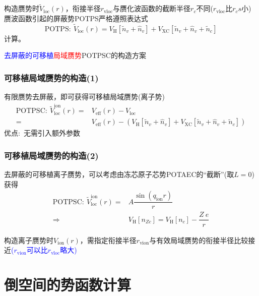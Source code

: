 构造赝势时$\tilde{V}_{\mathrm{loc}}(r)$，衔接半径$r_{\mathrm{vloc}}$与赝化波函数的截断半径$r_c$不同($r_{\mathrm{vloc}}$比$r_cs$小)
赝波函数引起的屏蔽势\textrm{POTPS}严格遵照表达式
\begin{equation}
	\mathrm{POTPS}:~\tilde{V}_{\mathrm{loc}}(r) = V_{\mathrm{H}}[\tilde{n}_v+\hat{n}_v]+V_{\mathrm{XC}}[\tilde{n}_v+\hat{n}_v+\tilde{n}_c]
	\label{eq:POTPS}
\end{equation}
计算。

\textcolor{blue}{去屏蔽的}\textcolor{blue}{可移植}\textcolor{red}{局域赝势}\textrm{POTPSC}的构造方案

\subsubsection{可移植局域赝势的构造(1)}
有限赝势去屏蔽，即可获得可移植局域赝势(离子势)
\begin{equation}
	\begin{aligned}
		\mathrm{POTPSC}:~\tilde{V}^{\mathrm{ion}}_{\mathrm{loc}}(r) =& V_{\mathrm{eff}}(r)-V_{\mathrm{loc}}\\
		=&V_{\mathrm{eff}}(r)-(V_{\mathrm{H}}[\tilde{n}_v+\hat{n}_v]+V_{\mathrm{XC}}[\tilde{n}_v+\hat{n}_v+\tilde{n}_c])
	\end{aligned}
	\label{eq:POTPSC-unsreen}
\end{equation}
优点:~无需引入额外参数

\subsubsection{可移植局域赝势的构造(2)}
去屏蔽的可移植离子赝势，可以考虑由冻芯原子芯势\textrm{POTAEC}的“截断”(取$L=0$)获得
\begin{equation}
	\begin{aligned}
		\mathrm{POTPSC}:~\tilde{V}^{\mathrm{ion}}_{\mathrm{loc}}(r) =& A\dfrac{\sin(q_{\mathrm{ion}}r)}r\\
		\Rightarrow & V_{\mathrm{H}}[n_{Zc}]=V_{\mathrm{H}}[n_c]-\dfrac{Z~e}r
	\end{aligned}
	\label{eq:POTPSC-sine}
\end{equation}

构造离子赝势时$V_{\mathrm{ion}}(r)$，需指定衔接半径$r_{\mathrm{vion}}$与有效局域赝势的衔接半径比较接近\textcolor{blue}{($r_{\mathrm{vion}}$可以比$r_{\mathrm{vloc}}$略大)}


\section{倒空间的势函数计算}
